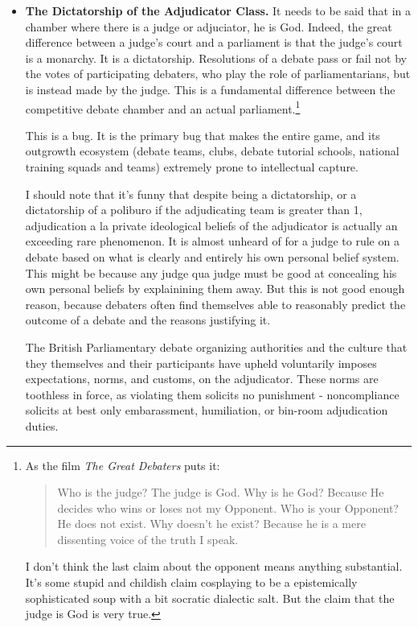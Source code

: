 \begin{itemize}
    \item \textbf{The Dictatorship of the Adjudicator Class.} It needs to be said that in a chamber where there is a judge or adjuciator, he is God. Indeed, the great difference between a judge's court and a parliament is that the judge's court is a monarchy. It is a dictatorship. Resolutions of a debate pass or fail not by the votes of participating debaters, who play the role of parliamentarians, but is instead made by the judge. This is a fundamental difference between the competitive debate chamber and an actual parliament.\footnote{
    As the film \textit{The Great Debaters} puts it: 
    \begin{quote}
        Who is the judge? The judge is God. Why is he God? Because He decides who wins or loses not my Opponent. Who is your Opponent? He does not exist. Why doesn’t he exist? Because he is a mere dissenting voice of the truth I speak.
    \end{quote}
    I don't think the last claim about the opponent means anything substantial. It's some stupid and childish claim cosplaying to be a epistemically sophisticated soup with a bit socratic dialectic salt. But the claim that the judge is God is very true.
    } 

This is a bug. It is the primary bug that makes the entire game, and its outgrowth ecosystem (debate teams, clubs, debate tutorial schools, national training squads and teams) extremely prone to intellectual capture.

I should note that it's funny that despite being a dictatorship, or a dictatorship of a poliburo if the adjudicating team is greater than 1, adjudication a la private ideological beliefs of the adjudicator is actually an exceeding rare phenomenon. It is almost unheard of for a judge to rule on a debate based on what is clearly and entirely his own personal belief system. This might be because any judge qua judge must be good at concealing his own personal beliefs by explainining them away. But this is not good enough reason, because debaters often find themselves able to reasonably predict the outcome of a debate and the reasons justifying it. 

The British Parliamentary debate organizing authorities and the culture that they themselves and their participants have upheld voluntarily imposes expectations, norms, and customs, on the adjudicator. These norms are toothless in force, as violating them solicits no punishment - noncompliance solicits at best only embarassment, humiliation, or bin-room adjudication duties. 


\end{itemize}
